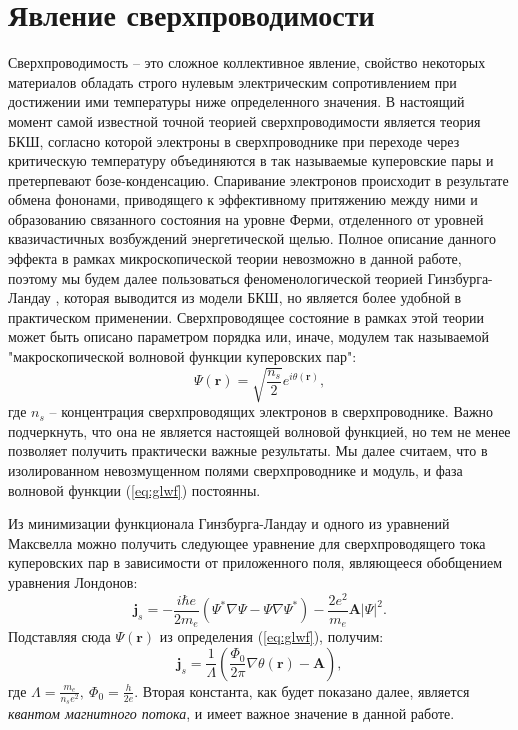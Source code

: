 \documentclass[12pt, twoside]{report}
\numberwithin{equation}{section}
\numberwithin{figure}{section}
\begin{document}
\section{Явление сверхпроводимости}
Сверхпроводимость -- это сложное коллективное явление, свойство некоторых материалов обладать строго нулевым электрическим сопротивлением при достижении ими температуры ниже определенного значения. В настоящий момент самой известной точной теорией сверхпроводимости является теория БКШ\cite{Schrieffer1999}, согласно которой электроны в сверхпроводнике при переходе через критическую температуру объединяются в так называемые куперовские пары и претерпевают бозе-конденсацию. Спаривание электронов происходит в результате обмена фононами, приводящего к эффективному притяжению между ними и образованию связанного состояния на уровне Ферми, отделенного от уровней квазичастичных возбуждений энергетической щелью. Полное описание данного эффекта в рамках микроскопической теории невозможно в данной работе, поэтому мы будем далее пользоваться феноменологической теорией Гинзбурга-Ландау \cite{GL1950}, которая выводится из модели БКШ\cite{Gorkov1959}, но является более удобной в практическом применении. Сверхпроводящее состояние в рамках этой теории может быть описано параметром порядка или, иначе, модулем так называемой "макроскопической волновой функции куперовских пар":
\begin{equation}
\Psi(\mathbf{r}) = \sqrt{\frac{n_s}{2}}e^{i\theta(\mathbf{r})},
\label{eq:glwf} 
\end{equation}
где $n_s$ -- концентрация сверхпроводящих электронов в сверхпроводнике. Важно подчеркнуть, что она не является настоящей волновой функцией, но тем не менее позволяет получить практически важные результаты. Мы далее считаем, что в изолированном невозмущенном полями сверхпроводнике и модуль, и фаза волновой функции (\ref{eq:glwf}) постоянны.

Из минимизации функционала Гинзбурга-Ландау и одного из уравнений Максвелла можно получить следующее уравнение для сверхпроводящего тока куперовских пар в зависимости от приложенного поля, являющееся обобщением уравнения Лондонов:
\begin{equation}
\mathbf{j}_s = -\frac{i\hbar e}{2m_e}(\Psi^*\nabla\Psi - \Psi\nabla\Psi^*) - \frac{2e^2}{m_e}\mathbf{A}|\Psi|^2.
\label{eq:lond}
\end{equation}
Подставляя сюда $\Psi(\mathbf{r})$ из определения (\ref{eq:glwf}), получим:
\begin{equation}
\mathbf{j}_s = \frac{1}{\Lambda}\left(\frac{\Phi_0}{2\pi}\nabla\theta(\mathbf{r})-\mathbf{A}\right),
\label{eq:lond2}
\end{equation}
где $\displaystyle \Lambda = \frac{m_e}{n_s e^2},\ \Phi_0 = \frac{h}{2e}$. Вторая константа, как будет показано далее, является \textit{квантом магнитного потока}, и имеет важное значение в данной работе.
\fi
\end{document}
